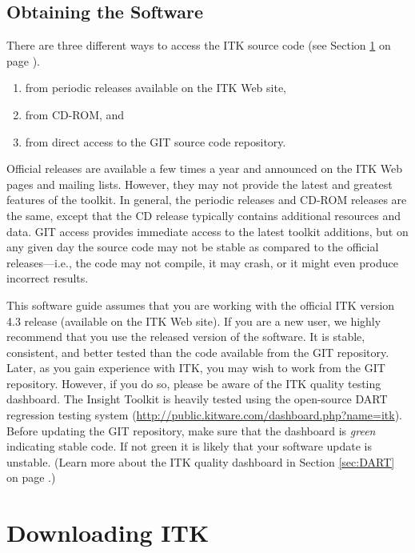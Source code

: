 \subsection{Obtaining the Software}
\label{sec:ObtainingTheSoftware}

There are three different ways to access the ITK source code
(see Section \ref{sec:DownloadingITK} on page \pageref{sec:DownloadingITK}).
\begin{enumerate}
	\item	from periodic releases available on the ITK Web site,
	\item	from CD-ROM, and
	\item	from direct access to the GIT source code repository.
\end{enumerate}
Official releases are available a few times a year and announced on the ITK
Web pages and mailing lists. However, they may not provide the latest and
greatest features of the toolkit. In general, the periodic releases and
CD-ROM releases are the same, except that the CD release typically contains
additional resources and data. GIT access provides immediate access to the
latest toolkit additions, but on any given day the source code may not be
stable as compared to the official releases---i.e., the code may not compile,
it may crash, or it might even produce incorrect results.

This software guide assumes that you are working with the official ITK
version 4.3 release (available on the ITK Web site). If you are a new user,
we highly recommend that you use the released version of the software. It is
stable, consistent, and better tested than the code available from the GIT
repository. Later, as you gain experience with ITK, you may wish to work from
the GIT repository. However, if you do so, please be aware of the ITK quality
testing dashboard. The Insight Toolkit is heavily tested using the
open-source DART regression testing system
(\url{http://public.kitware.com/dashboard.php?name=itk}). Before updating the GIT
repository, make sure that the dashboard is \emph{green} indicating stable
code. If not green it is likely that your software update is unstable. (Learn
more about the ITK quality dashboard in Section
\ref{sec:DART} on page \pageref{sec:DART}.)

\section{Downloading ITK}
\label{sec:DownloadingITK}
 
